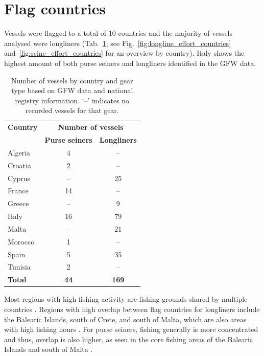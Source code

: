 \FloatBarrier
\section{Flag countries}

Vessels were flagged to a total of 10 countries and the majority of vessels analysed were longliners (Tab.~\ref{tab:countries_vessels}; see 
Fig.~\ref{fig:longline_effort_countries} and~\ref{fig:seine_effort_countries} for an overview by country).
Italy shows the highest amount of both purse seiners and longliners identified in the GFW data.

\medskip

\begin{table}[ht]
\centering
\caption{Number of vessels by country and gear type based on GFW data and national registry information. ‘--’ indicates no recorded vessels for that gear.}
\medskip
\begin{tabular}{lcc}
\toprule
\textbf{Country} & \multicolumn{2}{c}{\textbf{Number of vessels}} \\
\cmidrule(lr){2-3}
                 & \textbf{Purse seiners} & \textbf{Longliners} \\
\midrule
Algeria   & 4   & -- \\
Croatia   & 2   & -- \\
Cyprus    & --  & 25 \\
France    & 14  & -- \\
Greece    & --  & 9 \\
Italy     & 16  & 79 \\
Malta     & --  & 21 \\
Morocco   & 1   & -- \\
Spain     & 5   & 35 \\
Tunisia   & 2   & -- \\
\midrule
\textbf{Total}   & \textbf{44} & \textbf{169} \\
\bottomrule
\end{tabular}
\label{tab:countries_vessels}
\end{table}

Most regions with high fishing activity are fishing grounds shared by multiple countries . Regions with high overlap between flag countries
for longliners include the Balearic Islands, south of Crete, and south of Malta, which are also areas with high fishing hours .
For purse seiners, fishing generally is more concentrated and thus, overlap is also higher, as seen in the core fishing areas of the Balearic Islands and south of Malta .

